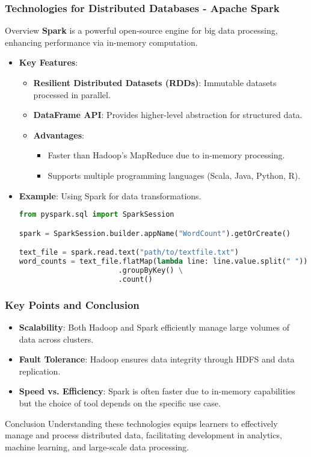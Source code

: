 \documentclass[aspectratio=169]{beamer}
\begin{document}
\begin{frame}[fragile]
  \frametitle{Technologies for Distributed Databases - Apache Spark}
  \begin{block}{Overview}
      \textbf{Spark} is a powerful open-source engine for big data processing, enhancing performance via in-memory computation.
  \end{block}
  \begin{itemize}
      \item \textbf{Key Features}:
          \begin{itemize}
              \item \textbf{Resilient Distributed Datasets (RDDs)}: Immutable datasets processed in parallel.
              \item \textbf{DataFrame API}: Provides higher-level abstraction for structured data.
              \item \textbf{Advantages}:
                  \begin{itemize}
                      \item Faster than Hadoop's MapReduce due to in-memory processing.
                      \item Supports multiple programming languages (Scala, Java, Python, R).
                  \end{itemize}
          \end{itemize}
      \item \textbf{Example}: Using Spark for data transformations.
      \begin{lstlisting}[language=Python]
from pyspark.sql import SparkSession

spark = SparkSession.builder.appName("WordCount").getOrCreate()

text_file = spark.read.text("path/to/textfile.txt")
word_counts = text_file.flatMap(lambda line: line.value.split(" ")) \
                       .groupByKey() \
                       .count()
      \end{lstlisting}
  \end{itemize}
\end{frame}

\begin{frame}[fragile]
  \frametitle{Key Points and Conclusion}
  \begin{itemize}
      \item \textbf{Scalability}: Both Hadoop and Spark efficiently manage large volumes of data across clusters.
      \item \textbf{Fault Tolerance}: Hadoop ensures data integrity through HDFS and data replication.
      \item \textbf{Speed vs. Efficiency}: Spark is often faster due to in-memory capabilities but the choice of tool depends on the specific use case.
  \end{itemize}

  \begin{block}{Conclusion}
      Understanding these technologies equips learners to effectively manage and process distributed data, facilitating development in analytics, machine learning, and large-scale data processing.
  \end{block}
\end{frame}
\end{document}
